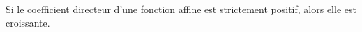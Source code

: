Si le coefficient directeur d'une fonction affine est strictement positif, alors elle est croissante.

\begin{reponses}
\end{reponses}

\begin{comment}

\end{comment}

